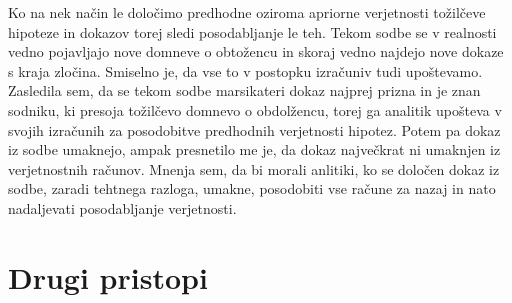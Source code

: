 \documentclass[12pt,a4paper]{amsart}
\theoremstyle{definition} %
\theoremstyle{plain} %
\begin{document}
Ko na nek način le določimo predhodne oziroma apriorne verjetnosti tožilčeve hipoteze in dokazov torej sledi posodabljanje le teh. Tekom sodbe se v realnosti vedno 
pojavljajo nove domneve o obtožencu in skoraj vedno najdejo nove dokaze s kraja zločina. Smiselno je, da vse to v postopku izračuniv tudi upoštevamo. Zasledila sem, da 
se tekom sodbe marsikateri dokaz najprej prizna in je znan sodniku, ki presoja tožilčevo domnevo o obdolžencu, torej ga analitik upošteva v svojih izračunih za posodobitve 
predhodnih verjetnosti hipotez. Potem pa dokaz iz sodbe umaknejo, ampak presnetilo me je, da dokaz največkrat ni umaknjen iz verjetnostnih računov. Mnenja sem, da bi 
morali anlitiki, ko se določen dokaz iz sodbe, zaradi tehtnega razloga, umakne, posodobiti vse račune za nazaj in nato nadaljevati posodabljanje verjetnosti. 

\section{Drugi pristopi}

\end{document}
